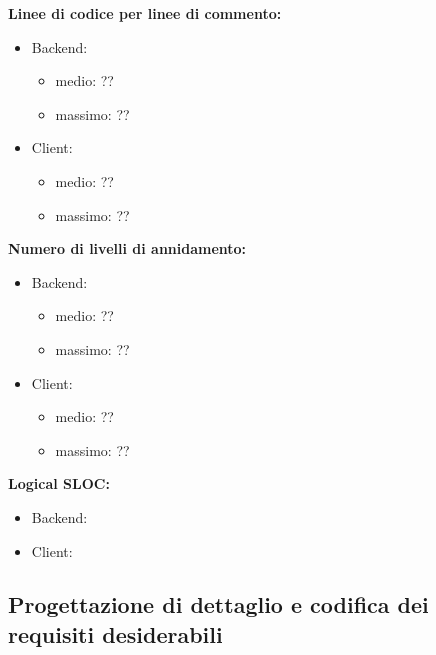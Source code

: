 \begin{description}
				\item \textbf{Linee di codice per linee di commento:}
					\begin{itemize}
						\item Backend:
							\begin{itemize}
								\item medio: ??
								\item massimo: ??
							\end{itemize}
						\item Client:
							\begin{itemize}
								\item medio: ??
								\item massimo: ??
							\end{itemize}
					\end{itemize}
							
				\item \textbf{Numero di livelli di annidamento:}
					\begin{itemize}
						\item Backend:
							\begin{itemize}
								\item medio: ??
								\item massimo: ??
							\end{itemize}
						\item Client:
							\begin{itemize}
								\item medio: ??
								\item massimo: ??
							\end{itemize}
					\end{itemize}
					
				\item \textbf{Logical SLOC:}
					\begin{itemize}
						\item Backend:
						\item Client:
					\end{itemize}
			\end{description}
					
	\subsection{Progettazione di dettaglio e codifica dei requisiti desiderabili}
